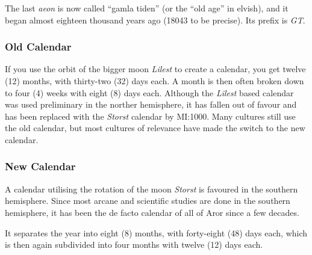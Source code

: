 The last \emph{aeon} is now called ``gamla tiden'' (or the ``old age''
in elvish), and it began almost eighteen thousand years ago (18043 to
be precise). Its prefix is \emph{GT}.

\subsubsection{Old Calendar}
\label{sec:Old Calendar}

If you use the orbit of the bigger moon \emph{Lilest} to create a
calendar, you get twelve (12) months, with thirty-two (32) days
each. A month is then often broken down to four (4) weeks with eight
(8) days each. Although the \emph{Lilest} based calendar was used
preliminary in the norther hemisphere, it has fallen out of favour and
has been replaced with the \emph{Storst} calendar by MI:1000. Many
cultures still use the old calendar, but most cultures of relevance
have made the switch to the new calendar.

\subsubsection{New Calendar}
\label{sec:New Calendar}

A calendar utilising the rotation of the moon \emph{Storst} is favoured
in the southern hemisphere. Since most arcane and scientific studies are
done in the southern hemisphere, it has been the de facto calendar of all
of Aror since a few decades.

It separates the year into eight (8) months, with forty-eight (48) days
each, which is then again subdivided into four months with twelve (12)
days each.



